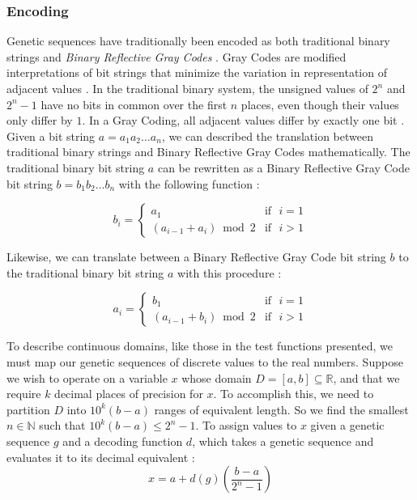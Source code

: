  \subsubsection*{Encoding}
Genetic sequences have traditionally been encoded as both traditional binary strings and \emph{Binary Reflective Gray Codes} \cite{Whitley97}. Gray Codes are modified interpretations of bit strings that minimize the variation in representation of adjacent values \cite{Back93}. In the traditional binary system, the unsigned values of $2^n$ and $2^n - 1$ have no bits in common over the first $n$ places, even though their values only differ by $1$. In a Gray Coding, all adjacent values differ by exactly one bit \cite{Michalewicz98}. Given a bit string $a = a_1 a_2 \ldots a_n$, we can described the translation between traditional binary strings and Binary Reflective Gray Codes mathematically. The traditional binary bit string $a$ can be rewritten as a Binary Reflective Gray Code bit string $b =  b_1 b_2 \ldots b_n$ with the following function \cite{Back93}:

\begin{displaymath}
   b_i = \left\{
     \begin{array}{cr}
       a_1 & \text{if~ } i = 1 \\
       (a_{i-1} + a_i) \bmod{2} & \text{if~ } i > 1
     \end{array}
   \right.
\end{displaymath} 

Likewise, we can translate between a Binary Reflective Gray Code bit string $b$ to the traditional binary bit string $a$ with this procedure \cite{Back93}:

\begin{displaymath}
   a_i = \left\{
     \begin{array}{cr}
       b_1 & \text{if~ } i = 1 \\
       (a_{i-1} + b_i) \bmod{2} & \text{if~ } i > 1
     \end{array}
   \right.
\end{displaymath} 

To describe continuous domains, like those in the test functions presented, we must map our genetic sequences of discrete values to the real numbers. Suppose we wish to operate on a variable $x$ whose domain $D = [a,b] \subseteq \mathbb{R}$, and that we require $k$ decimal places of precision for $x$. To accomplish this, we need to partition $D$ into $10^k(b - a)$ ranges of equivalent length. So we find the smallest $n \in \mathbb{N}$ such that $10^k(b - a) \leq 2^n - 1$. To assign values to $x$ given a genetic sequence $g$ and a decoding function $d$, which takes a genetic sequence and evaluates it to its decimal equivalent \cite{Michalewicz98}:
\[ x = a + d(g) \left( \frac{b-a}{2^n - 1} \right) \]

